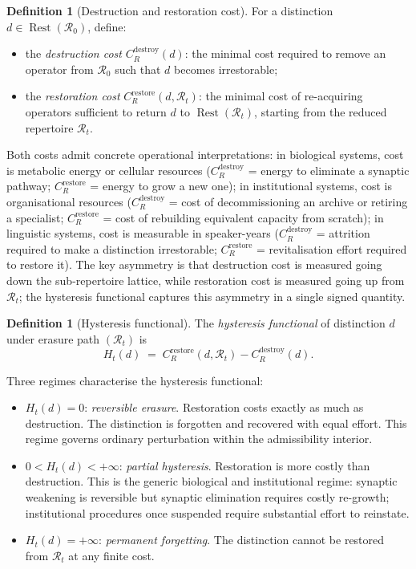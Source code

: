 \documentclass[12pt, oneside]{article}
\theoremstyle{plain}
\theoremstyle{definition}
\newtheorem{definition}[theorem]{Definition}
\theoremstyle{remark}
\DeclareMathOperator{\Rest}{Rest}
\newcommand{\CR}{C_{\!R}}
\newcommand{\Rt}{\mathcal{R}_t}
\newcommand{\Rzero}{\mathcal{R}_0}
\newcommand{\Restzero}{\Rest(\Rzero)}
\newcommand{\Hyster}{H}
\begin{document}
\begin{definition}[Destruction and restoration cost]
  For a distinction $d \in \Restzero$, define:
  \begin{itemize}
    \item the \emph{destruction cost}
      $\CR^{\mathrm{destroy}}(d)$: the minimal cost required to
      remove an operator from $\Rzero$ such that $d$ becomes
      irrestorable;
    \item the \emph{restoration cost}
      $\CR^{\mathrm{restore}}(d, \Rt)$: the minimal cost of
      re-acquiring operators sufficient to return $d$ to
      $\Rest(\Rt)$, starting from the reduced repertoire $\Rt$.
  \end{itemize}
  Both costs admit concrete operational interpretations:
  in biological systems, cost is metabolic energy or cellular
  resources ($\CR^{\mathrm{destroy}}$ = energy to eliminate a
  synaptic pathway; $\CR^{\mathrm{restore}}$ = energy to grow a
  new one); in institutional systems, cost is organisational
  resources ($\CR^{\mathrm{destroy}}$ = cost of decommissioning
  an archive or retiring a specialist;
  $\CR^{\mathrm{restore}}$ = cost of rebuilding equivalent
  capacity from scratch); in linguistic systems, cost is
  measurable in speaker-years
  ($\CR^{\mathrm{destroy}}$ = attrition required to make a
  distinction irrestorable; $\CR^{\mathrm{restore}}$ =
  revitalisation effort required to restore it).
  The key asymmetry is that destruction cost is measured going
  down the sub-repertoire lattice, while restoration cost is
  measured going up from $\Rt$; the hysteresis functional
  captures this asymmetry in a single signed quantity.
\end{definition}

\begin{definition}[Hysteresis functional]
  The \emph{hysteresis functional} of distinction $d$ under
  erasure path $(\Rt)$ is
  \[
    \Hyster_t(d)
    \;=\;
    \CR^{\mathrm{restore}}(d, \Rt)
    - \CR^{\mathrm{destroy}}(d).
  \]
  \label{def:hysteresis}
\end{definition}

Three regimes characterise the hysteresis functional:

\begin{itemize}
  \item $\Hyster_t(d) = 0$: \emph{reversible erasure}.
    Restoration costs exactly as much as destruction.
    The distinction is forgotten and recovered with equal effort.
    This regime governs ordinary perturbation within the
    admissibility interior.

  \item $0 < \Hyster_t(d) < +\infty$: \emph{partial hysteresis}.
    Restoration is more costly than destruction.
    This is the generic biological and institutional regime:
    synaptic weakening is reversible but synaptic elimination
    requires costly re-growth; institutional procedures once
    suspended require substantial effort to reinstate.

  \item $\Hyster_t(d) = +\infty$: \emph{permanent forgetting}.
    The distinction cannot be restored from $\Rt$ at any finite
    cost.
\end{itemize}
\end{document}
